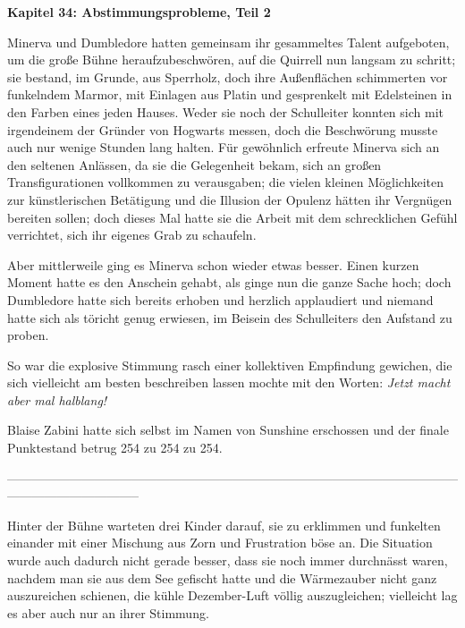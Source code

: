 

\hypertarget{abstimmungsprobleme-teil-2}{%

\textbf{Kapitel 34: Abstimmungsprobleme, Teil 2}

Minerva und Dumbledore hatten gemeinsam ihr gesammeltes Talent aufgeboten, um die große Bühne heraufzubeschwören, auf die Quirrell nun langsam zu schritt; sie bestand, im Grunde, aus Sperrholz, doch ihre Außenflächen schimmerten vor funkelndem Marmor, mit Einlagen aus Platin und gesprenkelt mit Edelsteinen in den Farben eines jeden Hauses. Weder sie noch der Schulleiter konnten sich mit irgendeinem der Gründer von Hogwarts messen, doch die Beschwörung musste auch nur wenige Stunden lang halten. Für gewöhnlich erfreute Minerva sich an den seltenen Anlässen, da sie die Gelegenheit bekam, sich an großen Transfigurationen vollkommen zu verausgaben; die vielen kleinen Möglichkeiten zur künstlerischen Betätigung und die Illusion der Opulenz hätten ihr Vergnügen bereiten sollen; doch dieses Mal hatte sie die Arbeit mit dem schrecklichen Gefühl verrichtet, sich ihr eigenes Grab zu schaufeln.

Aber mittlerweile ging es Minerva schon wieder etwas besser. Einen kurzen Moment hatte es den Anschein gehabt, als ginge nun die ganze Sache hoch; doch Dumbledore hatte sich bereits erhoben und herzlich applaudiert und niemand hatte sich als töricht genug erwiesen, im Beisein des Schulleiters den Aufstand zu proben.

So war die explosive Stimmung rasch einer kollektiven Empfindung gewichen, die sich vielleicht am besten beschreiben lassen mochte mit den Worten: \emph{Jetzt macht aber mal halblang!}

Blaise Zabini hatte sich selbst im Namen von Sunshine erschossen und der finale Punktestand betrug 254 zu 254 zu 254.

--------------------------------------------------------------------------------------------------------------------------------------------

Hinter der Bühne warteten drei Kinder darauf, sie zu erklimmen und funkelten einander mit einer Mischung aus Zorn und Frustration böse an. Die Situation wurde auch dadurch nicht gerade besser, dass sie noch immer durchnässt waren, nachdem man sie aus dem See gefischt hatte und die Wärmezauber nicht ganz auszureichen schienen, die kühle Dezember-Luft völlig auszugleichen; vielleicht lag es aber auch nur an ihrer Stimmung.

}
